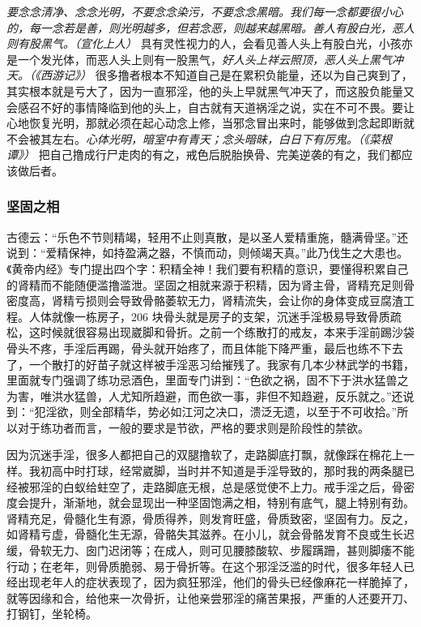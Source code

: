 \textit{要念念清净、念念光明，不要念念染污，不要念念黑暗。我们每一念都要很小心的，每一念若是善，则光明越多，但若念恶，则越来越黑暗。善人有股白光，恶人则有股黑气。（宣化上人）} 具有灵性视力的人，会看见善人头上有股白光，小孩亦是一个发光体，而恶人头上则有一股黑气，\textit{好人头上祥云照顶，恶人头上黑气冲天。（《西游记》）} 很多撸者根本不知道自己是在累积负能量，还以为自己爽到了，其实根本就是亏大了，因为一直邪淫，他的头上早就黑气冲天了，而这股负能量又会感召不好的事情降临到他的头上，自古就有天道祸淫之说，实在不可不畏。要让心地恢复光明，那就必须在起心动念上修，当邪念冒出来时，能够做到念起即断就不会被其左右。\textit{心体光明，暗室中有青天；念头暗昧，白日下有厉鬼。（《菜根谭》）} 把自己撸成行尸走肉的有之，戒色后脱胎换骨、完美逆袭的有之，我们都应该做后者。

\subsubsection{坚固之相}

古德云：“乐色不节则精竭，轻用不止则真散，是以圣人爱精重施，髓满骨坚。”还说到：“爱精保神，如持盈满之器，不慎而动，则倾竭天真。”此乃伐生之大患也。《黄帝内经》专门提出四个字：积精全神！我们要有积精的意识，要懂得积累自己的肾精而不能随便滥撸滥泄。坚固之相就来源于积精，因为肾主骨，肾精充足则骨密度高，肾精亏损则会导致骨骼萎软无力，肾精流失，会让你的身体变成豆腐渣工程。人体就像一栋房子，206 块骨头就是房子的支架，沉迷手淫极易导致骨质疏松，这时候就很容易出现崴脚和骨折。之前一个练散打的戒友，本来手淫前踢沙袋骨头不疼，手淫后再踢，骨头就开始疼了，而且体能下降严重，最后也练不下去了，一个散打的好苗子就这样被手淫恶习给摧残了。我家有几本少林武学的书籍，里面就专门强调了练功忌酒色，里面专门讲到：“色欲之祸，固不下于洪水猛兽之为害，唯洪水猛兽，人尤知所趋避，而色欲一事，非但不知趋避，反乐就之。”还说到：“犯淫欲，则全部精华，势必如江河之决口，溃泛无遗，以至于不可收拾。”所以对于练功者而言，一般的要求是节欲，严格的要求则是阶段性的禁欲。

因为沉迷手淫，很多人都把自己的双腿撸软了，走路脚底打飘，就像踩在棉花上一样。我初高中时打球，经常崴脚，当时并不知道是手淫导致的，那时我的两条腿已经被邪淫的白蚁给蛀空了，走路脚底无根，总是感觉使不上力。戒手淫之后，骨密度会提升，渐渐地，就会显现出一种坚固饱满之相，特别有底气，腿上特别有劲。肾精充足，骨髓化生有源，骨质得养，则发育旺盛，骨质致密，坚固有力。反之，如肾精亏虚，骨髓化生无源，骨骼失其滋养。在小儿，就会骨骼发育不良或生长迟缓，骨软无力、囱门迟闭等；在成人，则可见腰膝酸软、步履蹒跚，甚则脚痿不能行动；在老年，则骨质脆弱、易于骨折等。在这个邪淫泛滥的时代，很多年轻人已经出现老年人的症状表现了，因为疯狂邪淫，他们的骨头已经像麻花一样脆掉了，就等因缘和合，给他来一次骨折，让他亲尝邪淫的痛苦果报，严重的人还要开刀、打钢钉，坐轮椅。

